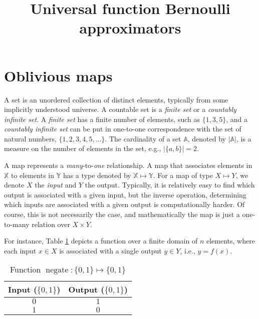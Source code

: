 \documentclass[
]{article}
\title{Universal function Bernoulli approximators}
\author{}
\date{\vspace{-2.5em}}
\theoremstyle{definition}
\theoremstyle{definition}
\theoremstyle{definition}
\theoremstyle{definition}
\theoremstyle{remark}
\begin{document}
\maketitle

{
\setcounter{tocdepth}{2}
\tableofcontents
}
\hypertarget{sec:map}{%
\section{Oblivious maps}\label{sec:map}}

A set is an unordered collection of distinct elements, typically from some implicitly understood universe.
A countable set is a \emph{finite set} or a \emph{countably infinite set}. A \emph{finite set} has a finite number of elements, such as \(\{ 1, 3, 5 \}\), and a \emph{countably infinite set} can be put in one-to-one correspondence with the set of natural numbers, \(\{1,2,3,4,5,\ldots\}\).
The cardinality of a set \(\mathbb{A}\), denoted by \(|\mathbb{A}|\), is a measure on the number of elements in the set, e.g., \(|\{a,b\}|=2\).

A map represents a \emph{many}-to-\emph{one} relationship. A map that associates elements in \(\mathbb{X}\) to elements in \(\mathbb{Y}\) has a type denoted by \(\mathbb{X}\mapsto\mathbb{Y}\).
For a map of type \(X \mapsto Y\), we denote \(X\) the \emph{input} and \(Y\) the output.
Typically, it is relatively easy to find which output is associated with a given
input, but the inverse operation, determining which inputs are associated with a
given output is computationally harder.
Of course, this is not necessarily the case, and mathematically the map is just
a one-to-many relation over \(X \times Y\).

For instance, Table \ref{tbl:tabfunc} depicts a function over a finite domain of \(n\)
elements, where each input \(x \in X\) is associated with a single output
\(y \in Y\), i.e., \(y = f(x)\).

\begin{table}
    \centering
    \caption{Function $\operatorname{negate} \colon \{0,1\} \mapsto \{0,1\}$}
    \label{tbl:tabfunc}
    \begin{tabular}{|c c|} 
        \hline
        Input ($\{0,1\}$) & Output ($\{0,1\}$)\\
        \hline
        $0$ & $1$\\
        $1$ & $0$\\    
        \hline
    \end{tabular}
\end{table}
\end{document}
